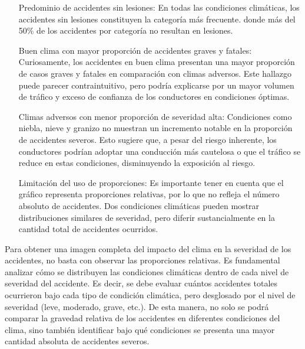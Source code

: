 \documentclass{book}
\begin{document}
\begin{enumerate}[align=left, leftmargin=*, labelwidth=0pt, labelsep=0pt, font=\bfseries]

\item[Predominio de accidentes sin lesiones: ] En todas las condiciones climáticas, los accidentes sin lesiones constituyen la categoría más frecuente. donde más del 50\% de los accidentes por categoría no resultan en lesiones.

\item[Buen clima con mayor proporción de accidentes graves y fatales: ] Curiosamente, los accidentes en buen clima presentan una mayor proporción de casos graves y fatales en comparación con climas adversos. Este hallazgo puede parecer contraintuitivo, pero podría explicarse por un mayor volumen de tráfico y exceso de confianza de los conductores en condiciones óptimas.

\item[Climas adversos con menor proporción de severidad alta: ]Condiciones como niebla, nieve y granizo no muestran un incremento notable en la proporción de accidentes severos. Esto sugiere que, a pesar del riesgo inherente, los conductores podrían adoptar una conducción más cautelosa o que el tráfico se reduce en estas condiciones, disminuyendo la exposición al riesgo.

\item[Limitación del uso de proporciones: ]Es importante tener en cuenta que el gráfico representa proporciones relativas, por lo que no refleja el número absoluto de accidentes. Dos condiciones climáticas pueden mostrar distribuciones similares de severidad, pero diferir sustancialmente en la cantidad total de accidentes ocurridos.

\end{enumerate}

Para obtener una imagen completa del impacto del clima en la severidad de los accidentes, no basta con observar las proporciones relativas. Es fundamental analizar cómo se distribuyen las condiciones climáticas dentro de cada nivel de severidad del accidente. Es decir, se debe evaluar cuántos accidentes totales ocurrieron bajo cada tipo de condición climática, pero desglosado por el nivel de severidad (leve, moderado, grave, etc.). De esta manera, no solo se podrá comparar la gravedad relativa de los accidentes en diferentes condiciones del clima, sino también identificar bajo qué condiciones se presenta una mayor cantidad absoluta de accidentes severos.
\end{document}
